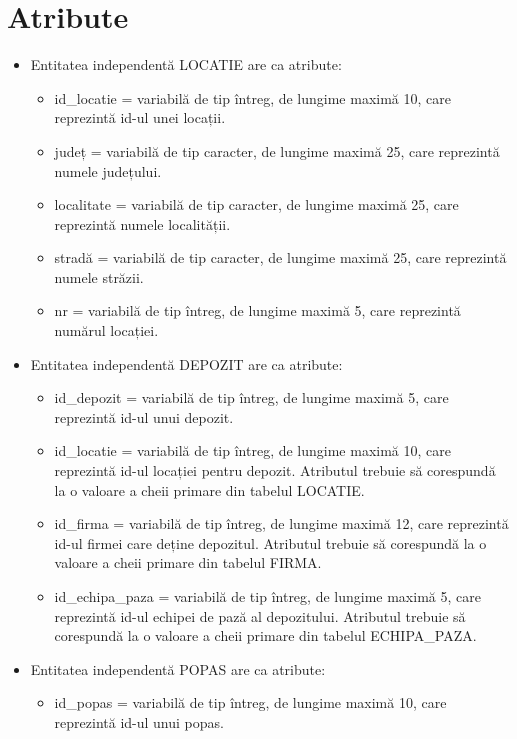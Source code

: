 \documentclass[12pt, a4paper]{article}
\begin{document}
\section{Atribute}
\begin{itemize}
    \item Entitatea independentă LOCATIE are ca atribute:
        \begin{itemize}
            \item id\_locatie = variabilă de tip întreg, de lungime maximă 10, care reprezintă id-ul unei locații.
            \item județ = variabilă de tip caracter, de lungime maximă 25, care reprezintă numele județului.
            \item localitate = variabilă de tip caracter, de lungime maximă 25, care reprezintă numele localității.
            \item stradă = variabilă de tip caracter, de lungime maximă 25, care reprezintă numele străzii.
            \item nr = variabilă de tip întreg, de lungime maximă 5, care reprezintă numărul locației.
        \end{itemize}
    \item Entitatea independentă DEPOZIT are ca atribute:
        \begin{itemize}
            \item id\_depozit = variabilă de tip întreg, de lungime maximă 5, care reprezintă id-ul unui depozit.
            \item id\_locatie = variabilă de tip întreg, de lungime maximă 10, care reprezintă id-ul locației pentru depozit. Atributul trebuie să corespundă la o valoare a cheii primare din tabelul LOCATIE.
            \item id\_firma = variabilă de tip întreg, de lungime maximă 12, care reprezintă id-ul firmei care deține depozitul. Atributul trebuie să corespundă la o valoare a cheii primare din tabelul FIRMA.
            \item id\_echipa\_paza = variabilă de tip întreg, de lungime maximă 5, care reprezintă id-ul echipei de pază al depozitului. Atributul trebuie să corespundă la o valoare a cheii primare din tabelul ECHIPA\_PAZA.
        \end{itemize}
    \item Entitatea independentă POPAS are ca atribute:
        \begin{itemize}
            \item id\_popas = variabilă de tip întreg, de lungime maximă 10, care reprezintă id-ul unui popas.

\end{itemize}
\end{itemize}
\end{document}
